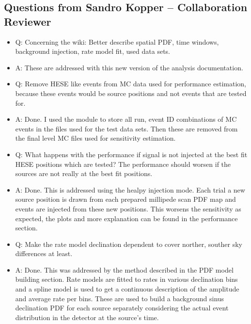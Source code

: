 \subsection*{Questions from Sandro Kopper -- Collaboration Reviewer}
  \begin{itemize}
      \item Q:
        Concerning the wiki: Better describe spatial PDF, time windows, background injection, rate model fit, used data sets.
      \item A:
        These are addressed with this new version of the analysis documentation.

      \item Q:
        Remove HESE like events from MC data used for performance estimation, because these events would be source positions and not events that are tested for.
      \item A:
        Done.
        I used the  module to store all run, event ID combinations of MC events in the  files used for the test data sets.
        Then these are removed from the final level MC files used for sensitivity estimation.

      \item Q:
        What happens with the performance if signal is not injected at the best fit HESE positions which are tested?
        The performance should worsen if the sources are not really at the best fit positions.
      \item A:
        Done.
        This is addressed using the healpy injection mode.
        Each trial a new source position is drawn from each prepared millipede scan PDF map and events are injected from these new positions.
        This worsens the sensitivity as expected, the plots and more explanation can be found in the performance section.

      \item Q:
        Make the rate model declination dependent to cover norther, souther sky differences at least.
      \item A:
        Done.
        This was addressed by the method described in the PDF model building section.
        Rate models are fitted to rates in various declination bins and a spline model is used to get a continuous description of the amplitude and average rate per bins.
        These are used to build a background sinus declination PDF for each source separately considering the actual event distribution in the detector at the source's time.


\end{itemize}
